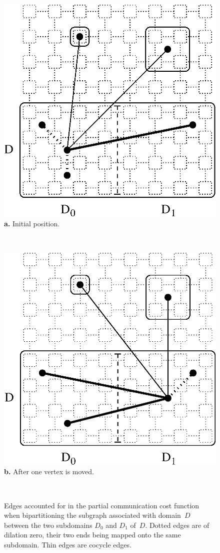 \begin{figure}[hbt]
\hfill
\parbox[b]{4.9cm}{
\hfill
\includegraphics[scale=0.40]{s_f_rua.eps}
\hfill\\
\textbf{a.} Initial position.
}\ \hfill\
\parbox[b]{4.9cm}{
\hfill
\includegraphics[scale=0.40]{s_f_rub.eps}
\hfill\\
\textbf{b.} After one vertex is moved.
}\hfill\
\caption%
{Edges accounted for in the partial communication cost function when
 bipartitioning the subgraph associated with domain~$D$ between
 the two subdomains $D_0$ and $D_1$ of~$D$.
 Dotted edges are of dilation zero, their two ends being mapped onto the
 same subdomain. Thin edges are cocycle edges.}
\label{fig-bipcost}
\end{figure}

